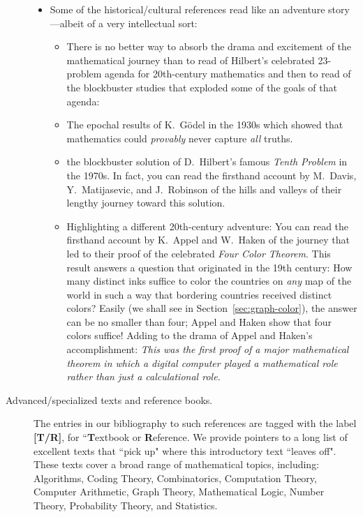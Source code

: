 \begin{description}
\begin{itemize}
\medskip\item
Some of the historical/cultural references read like an adventure story---albeit of a very intellectual sort:
   \begin{itemize}
   \item
There is no better way to absorb the drama and excitement of the mathematical journey than to read of Hilbert's celebrated 23-problem agenda for 20th-century mathematics and then to read of the blockbuster studies that exploded some of the goals of that agenda:

   \medskip\item
The epochal results of K.~G\"{o}del in the 1930s which showed that mathematics could {\em provably} never capture {\em all} truths.

   \medskip\item
the blockbuster solution of D.~Hilbert's famous {\em Tenth Problem} in the 1970s.  In fact, you can  read the firsthand account by M.~Davis, Y.~Matijasevic, and J.~Robinson of the hills and valleys of their lengthy journey toward this solution.

  \medskip\item
Highlighting a different 20th-century adventure:  You can read the firsthand account by K.~Appel and W.~Haken of the journey that led to their proof of the celebrated {\em Four Color Theorem}.  This result answers a question that originated in the 19th century: How many distinct inks suffice to color the countries on {\em any} map of the world in such a way that bordering countries received distinct colors?  Easily (we shall see in Section~\ref{sec:graph-color}), the answer can be no smaller than four; Appel and Haken show that four colors suffice!  Adding to the drama of Appel and Haken's accomplishment:  {\em This was the first proof of a major mathematical theorem in which a digital computer played a {\em mathematical} role rather than just a {\em calculational} role.}
   \end{itemize}
\end{itemize}

\medskip\item[{\sc Advanced/specialized texts and reference books}.]
The entries in our bibliography to such references are tagged with the label {\bf [T/R]}, for ``{\bf T}extbook or {\bf R}eference.  We provide pointers to a long list of excellent texts that ``pick up" where this introductory text ``leaves off".  These texts cover a broad range of mathematical topics, including: Algorithms, Coding Theory, Combinatorics, Computation Theory, Computer Arithmetic, Graph Theory, Mathematical Logic, Number Theory, Probability Theory, and Statistics.
\end{description}


